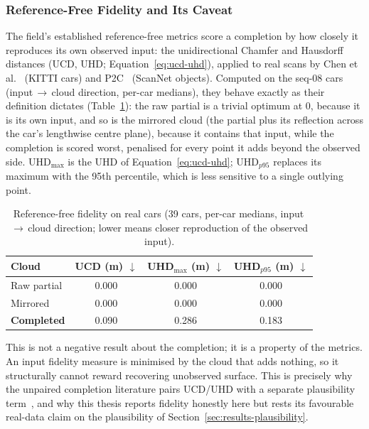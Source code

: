 \subsubsection{Reference-Free Fidelity and Its Caveat}
\label{sec:results-fidelity}

The field's established reference-free metrics score a completion by how closely it reproduces
its own observed input: the unidirectional Chamfer and Hausdorff distances (UCD, UHD;
Equation~\eqref{eq:ucd-uhd}), applied to real scans by Chen et
al.~\cite{chen2020unpaired} (KITTI cars) and P2C~\cite{cui2023p2c} (ScanNet objects). Computed on the seq-08 cars
(input\,$\to$\,cloud direction, per-car medians), they behave exactly as their definition
dictates (Table~\ref{tab:fidelity}): the raw partial is a trivial optimum at \num{0}, because
it is its own input, and so is the mirrored cloud (the partial plus its reflection across the
car's lengthwise centre plane), because it contains that input, while the completion is
scored worst, penalised for every point it adds beyond the observed side. UHD$_{\max}$ is the
UHD of Equation~\eqref{eq:ucd-uhd}; UHD$_{p95}$ replaces its maximum with the 95th percentile,
which is less sensitive to a single outlying point.

\begin{table}[H]
  \centering
  \caption[Reference-free fidelity metrics]{Reference-free fidelity on real cars (\num{39}
    cars, per-car medians, input\,$\to$\,cloud direction; lower means closer reproduction of
    the observed input).}
  \label{tab:fidelity}
  \begin{tabular}{lccc}
    \toprule
    Cloud & UCD (m) $\downarrow$ & UHD$_{\max}$ (m) $\downarrow$ & UHD$_{p95}$ (m) $\downarrow$ \\
    \midrule
    Raw partial        & 0.000 & 0.000 & 0.000 \\
    Mirrored           & 0.000 & 0.000 & 0.000 \\
    \textbf{Completed} & 0.090 & 0.286 & 0.183 \\
    \bottomrule
  \end{tabular}
\end{table}

This is not a negative result about the completion; it is a property of the metrics. An
input fidelity measure is minimised by the cloud that adds nothing, so it structurally cannot
reward recovering unobserved surface. This is precisely why the unpaired completion literature
pairs UCD/UHD with a separate plausibility term~\cite{chen2020unpaired}, and why this thesis
reports fidelity honestly here but rests its favourable real-data claim on the plausibility of
Section~\ref{sec:results-plausibility}.

